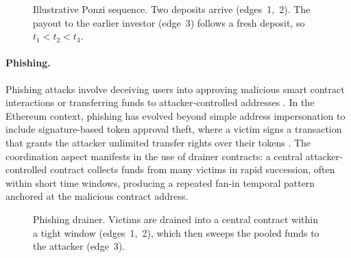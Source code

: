\begin{figure}[ht]
  \centering
  \caption[Ponzi candidate pattern]{Illustrative Ponzi sequence. Two deposits
    arrive (edges~1,~2). The payout to the earlier investor (edge~3) follows a fresh deposit,
    so $t_1 < t_2 < t_3$.}
  \label{fig:motif-ponzi}
\end{figure}

\paragraph{Phishing.}
Phishing attacks involve deceiving users into approving malicious smart contract interactions or transferring funds to attacker-controlled addresses \citep{chen2020phishing}. In the Ethereum context, phishing has evolved beyond simple address impersonation to include signature-based token approval theft, where a victim signs a transaction that grants the attacker unlimited transfer rights over their tokens \citep{hornuf2025cybercrime}. The coordination aspect manifests in the use of drainer contracts: a central attacker-controlled contract collects funds from many victims in rapid succession, often within short time windows, producing a repeated fan-in temporal pattern anchored at the malicious contract address.

\begin{figure}[ht]
  \centering
  \caption[Phishing transfer sequence]{Phishing drainer. Victims are drained into a
    central contract within a tight window (edges~1,~2), which then sweeps the
    pooled funds to the attacker (edge~3).}
  \label{fig:motif-phishing}
\end{figure}

